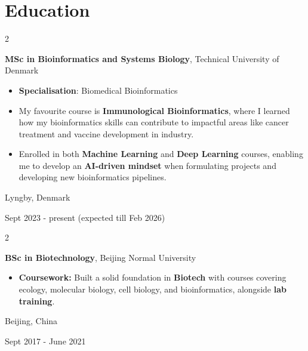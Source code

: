 \documentclass[10pt, letterpaper]{article}
\newenvironment{highlights}{
    \begin{itemize}[
        topsep=0.10 cm,
        parsep=0.10 cm,
        partopsep=0pt,
        itemsep=0pt,
        leftmargin=0.4 cm + 10pt
    ]
}{
    \end{itemize}
} %
\newenvironment{twocolentry}[2][]{
    \onecolentry
    \def\secondColumn{#2}
    \setcolumnwidth{\fill, 4.5 cm}
    \begin{paracol}{2}
}{
    \switchcolumn \raggedleft \secondColumn
    \end{paracol}
    \endonecolentry
} %
\begin{document}
    \section{Education}



        
        \begin{twocolentry}{
    Lyngby, Denmark

    Sept 2023 - present (expected till Feb 2026)
}
    \textbf{MSc in Bioinformatics and Systems Biology}, Technical University of Denmark
    \begin{highlights}
        \item \textbf{Specialisation}: Biomedical Bioinformatics
        \item My favourite course is \textbf{Immunological Bioinformatics}, where I learned how my bioinformatics skills can contribute to impactful areas like cancer treatment and vaccine development in industry.
        \item Enrolled in both \textbf{Machine Learning} and \textbf{Deep Learning} courses, enabling me to develop an \textbf{AI-driven mindset} when formulating projects and developing new bioinformatics pipelines. 
    \end{highlights}
\end{twocolentry}


        \vspace{0.3 cm}

\begin{twocolentry}{
    Beijing, China
    
    Sept 2017 - June 2021
}
    \textbf{BSc in Biotechnology}, Beijing Normal University
    \begin{highlights}
        \item \textbf{Coursework:} Built a solid foundation in \textbf{Biotech} with courses covering ecology, molecular biology, cell biology, and bioinformatics, alongside \textbf{lab training}.
    \end{highlights}
\end{twocolentry}
\end{document}

